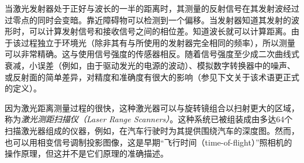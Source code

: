 当激光发射器处于正好与波长的一半的距离时，其测量的反射信号在其发射波经过过零点的同时会变暗。靠近障碍物可以检测到一个偏移。当发射器知道其发射的波形时，可以计算发射信号和接收信号之间的相位差。知道波长就可以计算距离。由于该过程独立于环境光（除非其有与所使用的发射器完全相同的频率），所以测量可以非常精确。这与使用信号强度的传感器相反。随着信号强度至少成二次曲线式衰减，小误差（例如，由于驱动发光的电源的波动）、模拟数字转换器中的噪声、或反射面的简单差异，对精度和准确度有很大的影响（参见下文关于该术语更正式的定义）。


因为激光距离测量过程的很快，这种激光器可以与旋转镜组合以扫射更大的区域，称为\emph{激光测距扫描仪（Laser Range Scanners）}。这种系统已被组装成由多达64个扫描激光器组成的仪器，例如，在汽车行驶时为其提供围绕汽车的深度图。然而，也可以用相变信号调制投影图像，这是早期“飞行时间（time-of-flight）”照相机的操作原理，但这并不是它们原理的准确描述。




